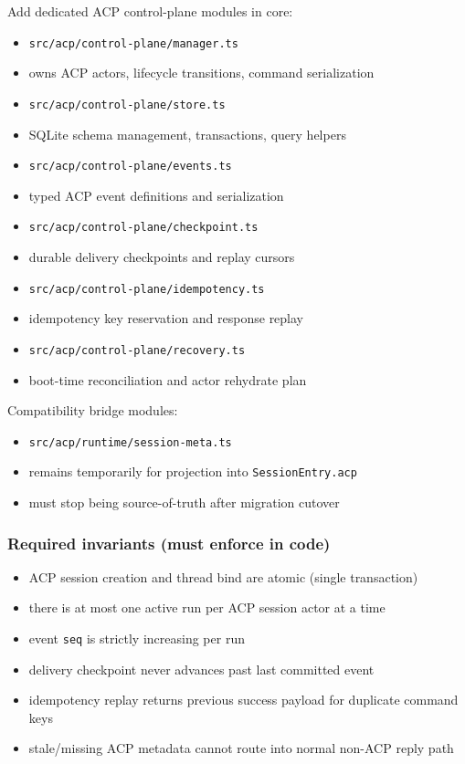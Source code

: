 Add dedicated ACP control-plane modules in core:

\begin{itemize}
  \item \texttt{src/acp/control-plane/manager.ts}
  \item owns ACP actors, lifecycle transitions, command serialization
  \item \texttt{src/acp/control-plane/store.ts}
  \item SQLite schema management, transactions, query helpers
  \item \texttt{src/acp/control-plane/events.ts}
  \item typed ACP event definitions and serialization
  \item \texttt{src/acp/control-plane/checkpoint.ts}
  \item durable delivery checkpoints and replay cursors
  \item \texttt{src/acp/control-plane/idempotency.ts}
  \item idempotency key reservation and response replay
  \item \texttt{src/acp/control-plane/recovery.ts}
  \item boot-time reconciliation and actor rehydrate plan
\end{itemize}


Compatibility bridge modules:

\begin{itemize}
  \item \texttt{src/acp/runtime/session-meta.ts}
  \item remains temporarily for projection into \texttt{SessionEntry.acp}
  \item must stop being source-of-truth after migration cutover
\end{itemize}


\subsubsection{Required invariants (must enforce in code)}


\begin{itemize}
  \item ACP session creation and thread bind are atomic (single transaction)
  \item there is at most one active run per ACP session actor at a time
  \item event \texttt{seq} is strictly increasing per run
  \item delivery checkpoint never advances past last committed event
  \item idempotency replay returns previous success payload for duplicate command keys
  \item stale/missing ACP metadata cannot route into normal non-ACP reply path
\end{itemize}


